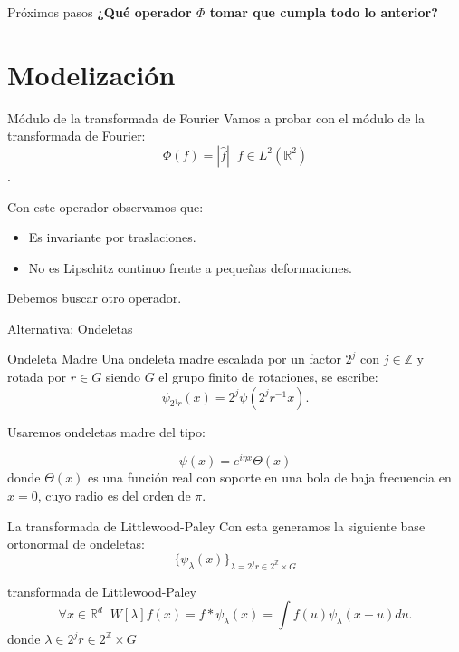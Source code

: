 \documentclass[aspectratio=43]{beamer}
\begin{document}
  \begin{frame}{Próximos pasos}
    \centering \textcolor{tudCyan}{\textbf{¿Qué operador $\Phi$ tomar que cumpla todo lo anterior?}}
  \end{frame}

\section{Modelización}

\begin{frame}{Módulo de la transformada de Fourier}
  \textcolor{tudCyan}{Vamos a probar con el módulo de la transformada de Fourier:}
  $$\Phi(f)=|\widehat{f}| \;\; f\in L^2(\mathbb{R}^2)$$.

  Con este operador observamos que: 
  \begin{itemize}
    \item Es invariante por traslaciones.
    \item No es Lipschitz continuo frente a pequeñas deformaciones.
  \end{itemize}

  Debemos buscar otro operador.
\end{frame}

\begin{frame}{Alternativa: Ondeletas}
  
  \begin{block}{Ondeleta Madre}
    Una ondeleta madre escalada por un factor $2^{j}$ con $j \in \mathbb{Z}$ y rotada por $r \in G$ siendo $G$ el grupo finito de rotaciones, se escribe: 
    $$\psi_{2^j r}(x)=2^{j} \psi(2^j r^{-1} x).$$
  \end{block}

  Usaremos ondeletas madre del tipo: 

  \begin{equation}
    \psi(x)=e^{i\eta x} \Theta(x)
  \end{equation}
  donde $\Theta(x)$ es una función real con soporte en una bola de baja frecuencia en $x=0$, cuyo radio es del orden de $\pi$.
\end{frame}

\begin{frame}{La transformada de Littlewood-Paley}
  Con esta generamos la siguiente base ortonormal de ondeletas: 
  \begin{equation}
    \lbrace \psi_\lambda (x) \rbrace_{\lambda= 2^j r \in 2^\mathbb{Z} \times G}
  \end{equation}

  \begin{block}{transformada de Littlewood-Paley}
    \begin{equation}
      \forall x \in  \mathbb{R}^d \;\; W[\lambda]f(x)= f \ast \psi_\lambda(x)=\int f(u)\psi_\lambda(x-u) du .
    \end{equation}
    donde $\lambda \in 2^j r \in 2^\mathbb{Z} \times G$
  \end{block}
\end{frame}
\end{document}
